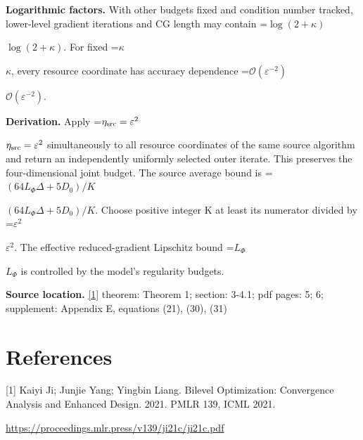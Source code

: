 \documentclass[10pt,a4paper]{article}
\newcommand{\AtlasMath}[1]{\par\begingroup\centering\setbox0=\hbox{$\displaystyle #1$}\ifdim\wd0>1.4\linewidth\typeout{ATLAS WIDE FORMULA: \the\wd0}\fi\ifdim\wd0>\linewidth\resizebox{\linewidth}{!}{\box0}\else\box0\fi\par\endgroup}
\newcommand{\AtlasInlineMath}[1]{\begingroup\setbox0=\hbox{$#1$}\ifdim\wd0>.4\linewidth\endgroup\AtlasMath{#1}\else\endgroup$#1$\fi}
\begin{document}
\textbf{Logarithmic factors.} With other budgets fixed and condition number tracked, lower-level gradient iterations and CG length may contain \AtlasInlineMath{\log(2+\kappa)}. For fixed \AtlasInlineMath{\kappa}, every resource coordinate has accuracy dependence \AtlasInlineMath{\mathcal O(\varepsilon^{-2})}.

\textbf{Derivation.} Apply \AtlasInlineMath{\eta_{\rm src}=\varepsilon^2} simultaneously to all resource coordinates of the same source algorithm and return an independently uniformly selected outer iterate. This preserves the four-dimensional joint budget. The source average bound is \AtlasInlineMath{(64L_\Phi\Delta+5D_0)/K}. Choose positive integer K at least its numerator divided by \AtlasInlineMath{\varepsilon^2}. The effective reduced-gradient Lipschitz bound \AtlasInlineMath{L_\Phi} is controlled by the model's regularity budgets.

\textbf{Source location.} \href{https://proceedings.mlr.press/v139/ji21c/ji21c.pdf}{[1]} theorem: Theorem 1; section: 3-4.1; pdf pages: 5; 6; supplement: Appendix E, equations (21), (30), (31)

\section{References}
[1] Kaiyi Ji; Junjie Yang; Yingbin Liang. Bilevel Optimization: Convergence Analysis and Enhanced Design. 2021. PMLR 139, ICML 2021.

\url{https://proceedings.mlr.press/v139/ji21c/ji21c.pdf}
\end{document}
